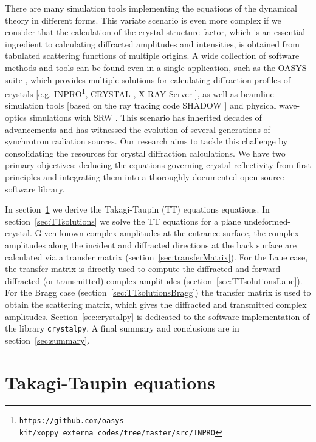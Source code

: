 \documentclass[preprint]{iucr}              %
\begin{document}
There are many simulation tools implementing the equations of the dynamical theory in different forms. This variate scenario is even more complex if we consider that the calculation of the crystal structure factor, which is an essential ingredient to calculating diffracted amplitudes and intensities, is obtained from tabulated scattering functions of multiple origins. A wide collection of software methods and tools can be found even in a single application, such as the OASYS suite \cite{codeOASYS}, which provides multiple solutions for calculating diffraction profiles of crystals [e.g. INPRO\footnote{\texttt{https://github.com/oasys-kit/xoppy\_externa\_codes/tree/master/src/INPRO}}, CRYSTAL \cite{codeCRYSTAL}, X-RAY Server \cite{codeXRAYserver}], as well as beamline simulation tools [based on the ray tracing code SHADOW \cite{codeSHADOW}] and physical wave-optics simulations with SRW \cite{codeSRW, codeSRWcrystals}.
This scenario has inherited decades of advancements and has witnessed the evolution of several generations of synchrotron radiation sources.
Our research aims to tackle this challenge by consolidating the resources for crystal diffraction calculations. We have two primary objectives: deducing the equations governing crystal reflectivity from first principles and integrating them into a thoroughly documented open-source software library.

In section~\ref{sec:TT} we derive the Takagi-Taupin (TT) equations \cite{Takagi1962, Taupin, Taupin1967} equations.
In section~\ref{sec:TTsolutions} we solve the TT equations for a plane undeformed-crystal.
Given known complex amplitudes at the entrance surface, the complex amplitudes along the incident and diffracted directions at the back surface are calculated via a transfer matrix (section~\ref{sec:transferMatrix}). For the Laue case, the transfer matrix is directly used to compute the diffracted and forward-diffracted (or transmitted) complex amplitudes (section~\ref{sec:TTsolutionsLaue}). For the Bragg case (section~\ref{sec:TTsolutionsBragg}) the transfer matrix is used to obtain the scattering matrix, which gives the diffracted and transmitted complex  amplitudes. 
Section~\ref{sec:crystalpy} is dedicated to the software implementation of the library \texttt{crystalpy}. A final summary and conclusions are in section~\ref{sec:summary}.
 
%
\section{Takagi-Taupin equations}
\label{sec:TT}
\end{document}
